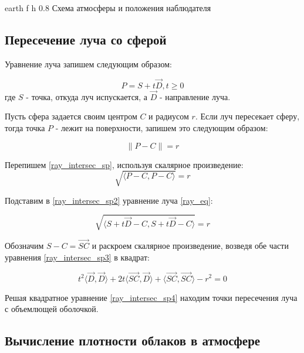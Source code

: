 {earth} %
{f} %
{h} %
{0.8\textwidth} %
{Схема атмосферы и положения наблюдателя} %


\subsection{Пересечение луча со сферой}

Уравнение луча запишем следующим образом:

\begin{equation}
	\label{ray_eq}
	P = S + t \vec{D}, t \ge 0
\end{equation}
где $ S $ - точка, откуда луч испускается, а $ \vec{D} $ - направление луча.

Пусть сфера задается своим центром $ C $ и радиусом $ r $. Если луч пересекает сферу, тогда точка $ P $ - лежит на поверхности, запишем это следующим образом:

\begin{equation}
	\label{ray_intersec_sp}
	\| P - C \| = r
\end{equation}

Перепишем \eqref{ray_intersec_sp}, используя скалярное произведение:
\begin{equation}
	\label{ray_intersec_sp2}
	\sqrt{\langle P - C , P - C \rangle} = r
\end{equation}

Подставим в \eqref{ray_intersec_sp2} уравнение луча \eqref{ray_eq}:

\begin{equation}
	\label{ray_intersec_sp3}
	\sqrt{\langle S + t \vec{D} - C , S + t \vec{D} - C \rangle} = r
\end{equation}

Обозначим $ S - C = \vec{SC} $ и раскроем скалярное произведение, возведя обе части уравнения \eqref{ray_intersec_sp3} в квадрат:

\begin{equation}
	\label{ray_intersec_sp4}
	t ^ 2 \langle \vec{D}, \vec{D} \rangle + 2t \langle \vec{SC}, \vec{D} \rangle + \langle \vec{SC}, \vec{SC} \rangle - r ^ 2 = 0
\end{equation}

Решая квадратное уравнение \eqref{ray_intersec_sp4} находим точки пересечения луча с объемлющей оболочкой.

\subsection{Вычисление плотности облаков в атмосфере}

